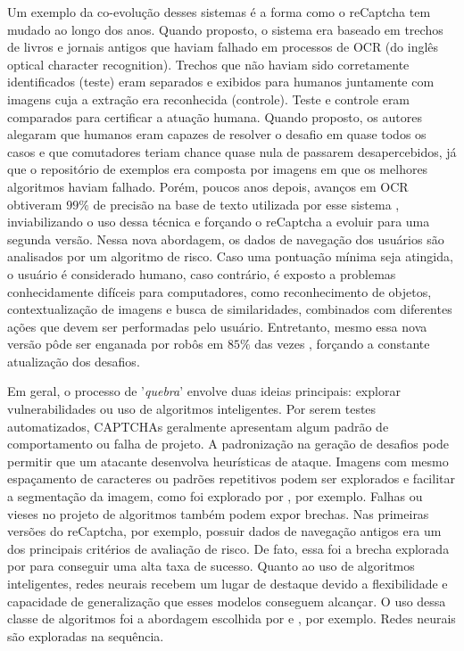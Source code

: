 Um exemplo da co-evolução desses sistemas é a forma como o reCaptcha \cite{recaptcha1} tem mudado ao longo dos anos. Quando proposto, o sistema era baseado em trechos de livros e jornais antigos que haviam falhado em processos de  OCR (do inglês optical character recognition). Trechos que não haviam sido corretamente identificados (teste) eram separados e exibidos para humanos juntamente com imagens cuja a extração era reconhecida (controle). Teste e controle eram comparados para certificar a atuação humana. Quando proposto, os autores alegaram que humanos eram capazes de resolver o desafio em quase todos os casos e que comutadores teriam chance quase nula de passarem desapercebidos, já que o repositório de exemplos era composta por imagens em que os melhores algoritmos haviam falhado. Porém, poucos anos depois, avanços em OCR obtiveram $99\%$ de precisão na base de texto utilizada por esse sistema \cite{captcha_break_2013}, inviabilizando o uso dessa técnica e forçando o reCaptcha a evoluir para uma segunda versão. Nessa nova abordagem, os dados de navegação dos usuários são analisados por um algoritmo de risco. Caso uma pontuação mínima seja atingida, o usuário é considerado humano, caso contrário, é exposto a problemas conhecidamente difíceis para computadores, como reconhecimento de objetos, contextualização de imagens e busca de similaridades, combinados com diferentes ações que devem ser performadas pelo usuário. Entretanto, mesmo essa nova versão pôde ser enganada por robôs em $85\%$ das vezes \cite{imarobot}, forçando a constante atualização dos desafios.

Em geral, o processo de '\textit{quebra}' envolve duas ideias principais: explorar vulnerabilidades ou uso de algoritmos inteligentes. Por serem testes automatizados, CAPTCHAs geralmente apresentam algum padrão de comportamento ou falha de projeto. A padronização na geração de desafios pode permitir que um atacante desenvolva heurísticas de ataque. Imagens com mesmo espaçamento de caracteres ou padrões repetitivos podem ser explorados e facilitar a segmentação da imagem, como foi explorado por \cite{naivecaptcha}, por exemplo. Falhas ou vieses no projeto de algoritmos também podem expor brechas. Nas primeiras versões do reCaptcha, por exemplo, possuir dados de navegação antigos era um dos principais critérios de avaliação de risco. De fato, essa foi a brecha explorada por \cite{imarobot} para conseguir uma alta taxa de sucesso. Quanto ao uso de algoritmos inteligentes, redes neurais recebem um lugar de destaque devido a flexibilidade e capacidade de generalização que esses modelos conseguem alcançar. O uso dessa classe de algoritmos foi a abordagem escolhida por \cite{captcha_break_2013} e \cite{lectures2005HIP}, por exemplo. Redes neurais são exploradas na sequência.


